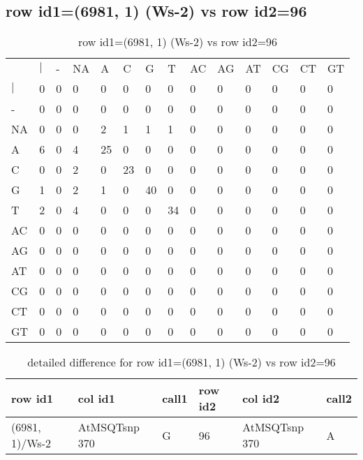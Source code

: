\subsection{row id1=(6981, 1) (Ws-2) vs row id2=96}
\begin{center}
\begin{longtable}{|l|l|l|l|l|l|l|l|l|l|l|l|l|l|}
\caption{row id1=(6981, 1) (Ws-2) vs row id2=96} \label{table_dm204}\\
\hline
\\
\hline
&$|$&-&NA&A&C&G&T&AC&AG&AT&CG&CT&GT\\
$|$&0&0&0&0&0&0&0&0&0&0&0&0&0\\
-&0&0&0&0&0&0&0&0&0&0&0&0&0\\
NA&0&0&0&2&1&1&1&0&0&0&0&0&0\\
A&6&0&4&25&0&0&0&0&0&0&0&0&0\\
C&0&0&2&0&23&0&0&0&0&0&0&0&0\\
G&1&0&2&1&0&40&0&0&0&0&0&0&0\\
T&2&0&4&0&0&0&34&0&0&0&0&0&0\\
AC&0&0&0&0&0&0&0&0&0&0&0&0&0\\
AG&0&0&0&0&0&0&0&0&0&0&0&0&0\\
AT&0&0&0&0&0&0&0&0&0&0&0&0&0\\
CG&0&0&0&0&0&0&0&0&0&0&0&0&0\\
CT&0&0&0&0&0&0&0&0&0&0&0&0&0\\
GT&0&0&0&0&0&0&0&0&0&0&0&0&0\\
\hline
\end{longtable}
\end{center}

\begin{center}
\begin{longtable}{|l|l|l|l|l|l|}
\caption{detailed difference for row id1=(6981, 1) (Ws-2) vs row id2=96} \label{table_dm205}\\
\hline
row id1&col id1&call1&row id2&col id2&call2\\
\hline
(6981, 1)/Ws-2&AtMSQTsnp 370&G&96&AtMSQTsnp 370&A\\
\hline
\end{longtable}
\end{center}

